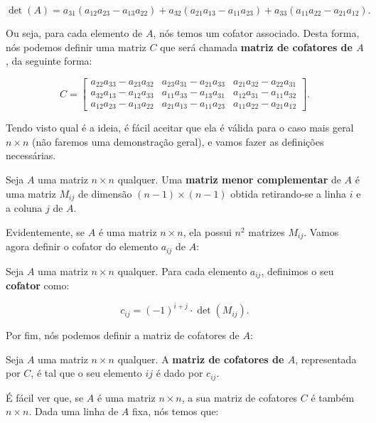 $$
\det(A) = a_{31}(a_{12}a_{23} - a_{13}a_{22}) + a_{32}(a_{21}a_{13} - a_{11}a_{23}) + a_{33}(a_{11}a_{22} - a_{21}a_{12}).
$$

Ou seja, para cada elemento de $A$, nós temos um cofator associado. Desta forma, nós podemos definir uma matriz $C$ que será chamada \textbf{matriz de cofatores de $A$}, da seguinte forma:

$$
C = \begin{bmatrix}
	a_{22}a_{33} - a_{23}a_{32} & a_{23}a_{31} - a_{21}a_{33} & a_{21}a_{32} - a_{22}a_{31} \\
	a_{32}a_{13} - a_{12}a_{33} & a_{11}a_{33} - a_{13}a_{31} & a_{12}a_{31} - a_{11}a_{32} \\
	a_{12}a_{23} - a_{13}a_{22} & a_{21}a_{13} - a_{11}a_{23} & a_{11}a_{22} - a_{21}a_{12}
\end{bmatrix}.
$$

Tendo visto qual é a ideia, é fácil aceitar que ela é válida para o caso mais geral $n\times n$ (não faremos uma demonstração geral), e vamos fazer as definições necessárias.

\begin{Definition}
	Seja $A$ uma matriz $n\times n$ qualquer. Uma \textbf{matriz menor complementar} de $A$ é uma matriz $M_{ij}$ de dimensão $(n - 1)\times (n - 1)$ obtida retirando-se a linha $i$ e a coluna $j$ de $A$.
\end{Definition}

Evidentemente, se $A$ é uma matriz $n\times n$, ela possui $n^2$ matrizes $M_{ij}$. Vamos agora definir o cofator do elemento $a_{ij}$ de $A$:

\begin{Definition}[Cofator]
	Seja $A$ uma matriz $n\times n$ qualquer. Para cada elemento $a_{ij}$, definimos o seu \textbf{cofator} como:
	
	$$
	c_{ij} = (-1)^{i + j}\cdot\det(M_{ij}).
	$$
\end{Definition}

Por fim, nós podemos definir a matriz de cofatores de $A$:

\begin{Definition}
	Seja $A$ uma matriz $n\times n$ qualquer. A \textbf{matriz de cofatores de $A$}, representada por $C$, é tal que o seu elemento $ij$ é dado por $c_{ij}$.
\end{Definition}

É fácil ver que, se $A$ é uma matriz $n\times n$, a sua matriz de cofatores $C$ é também $n\times n$. Dada uma linha de $A$ fixa, nós temos que:

